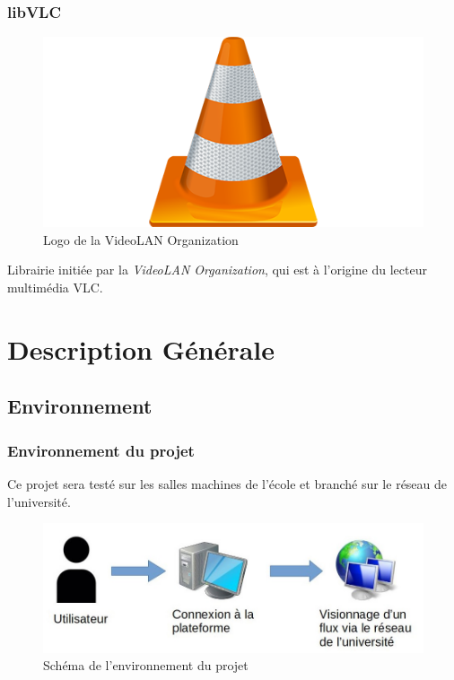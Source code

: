 \documentclass{beamer}
\begin{document}
\begin{frame}	
\frametitle{libVLC}

\begin{figure}
	\includegraphics[scale=0.25]{Rapport_PR&D/images/vlc-media-player-logo}
	\caption{Logo de la VideoLAN Organization}
\end{figure}

Librairie initiée par la \textit{VideoLAN Organization}, qui est à l'origine du lecteur multimédia VLC.


\end{frame}


\section{Description Générale}

\subsection{Environnement}

\begin{frame}
\frametitle{Environnement du projet}

Ce projet sera testé sur les salles machines de l'école et branché sur le réseau de l'université.

\begin{figure}
	\includegraphics[scale=0.5]{Rapport_PR&D/images/environnement}
	\caption{Schéma de l'environnement du projet}
\end{figure}

\end{frame}
\end{document}
